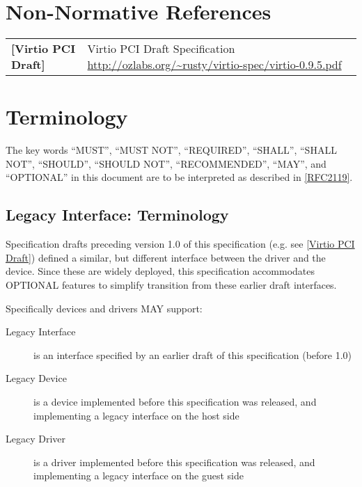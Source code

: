 \section{Non-Normative References}

\begin{longtable}{l p{5in}}
	\label{intro:Virtio PCI Draft}\textbf{[Virtio PCI Draft]} &
	Virtio PCI Draft Specification
	\newline\url{http://ozlabs.org/~rusty/virtio-spec/virtio-0.9.5.pdf}\\
\end{longtable}

\section{Terminology}\label{Terminology}

The key words ``MUST'', ``MUST NOT'', ``REQUIRED'', ``SHALL'', ``SHALL NOT'', ``SHOULD'', ``SHOULD NOT'', ``RECOMMENDED'', ``MAY'', and ``OPTIONAL'' in this document are to be interpreted as described in \hyperref[intro:rfc2119]{[RFC2119]}.

\subsection{Legacy Interface: Terminology}\label{intro:Legacy
Interface: Terminology}

Specification drafts preceding version 1.0 of this specification
(e.g. see \hyperref[intro:Virtio PCI Draft]{[Virtio PCI Draft]})
defined a similar, but different
interface between the driver and the device.
Since these are widely deployed, this specification
accommodates OPTIONAL features to simplify transition
from these earlier draft interfaces.

Specifically devices and drivers MAY support:
\begin{description}
\item[Legacy Interface]
        is an interface specified by an earlier draft of this specification
        (before 1.0)
\item[Legacy Device]
        is a device implemented before this specification was released,
        and implementing a legacy interface on the host side
\item[Legacy Driver]
        is a driver implemented before this specification was released,
        and implementing a legacy interface on the guest side
\end{description}

